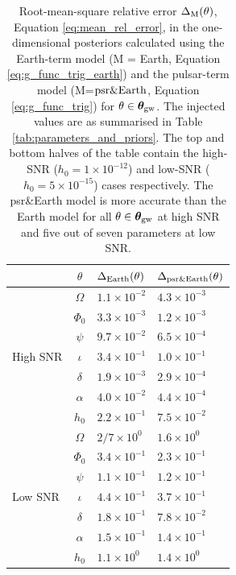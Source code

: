 \documentclass[fleqn,usenatbib,useAMS]{mnras}
\begin{document}
\begin{table}
	\centering
		\begin{tabular}{lcll}
			\toprule
			&$\theta$ & $\Delta_{\rm Earth}(\theta)$ & $\Delta_{\rm psr \& Earth}(\theta)$  \\
			\hline
			\multirow{7}{2mm}{High SNR} & $\Omega$       & $1.1 \times 10^{-2}$& $4.3 \times 10^{-3}$\\
			& $\Phi_0$ &$3.3 \times 10^{-3}$ &$1.2 \times 10^{-3}$ \\
			& $\psi$ &$9.7 \times 10^{-2}$ &$6.5 \times 10^{-4}$  \\
			& $\iota$ & $3.4 \times 10^{-1}$ & $1.0 \times 10^{-1}$  \\
			& $\delta$ &$1.9 \times10^{-3}$ &$2.9 \times 10^{-4}$  \\
			&$\alpha$ &$4.0 \times 10^{-2}$ &$4.4 \times10^{-4}$  \\
			&$h_0$ & $2.2 \times 10^{-1}$ &$7.5 \times 10^{-2}$  \\
			\hline
			\multirow{7}{2mm}{Low SNR} & $\Omega$       &  $2/7 \times 10^0$ &$1.6 \times 10^0$ \\
			& $\Phi_0$ &$3.4 \times 10^{-1}$ & $2.3 \times 10^{-1}$  \\
			& $\psi$ &$1.1 \times 10^{-1}$ &$1.2 \times 10^{-1}$  \\
			& $\iota$ & $4.4 \times 10^{-1}$ & $3.7 \times 10^{-1}$  \\
			& $\delta$ & $1.8 \times 10^{-1}$ & $7.8 \times 10^{-2}$  \\
			&$\alpha$ & $1.5 \times 10^{-1}$ & $1.4 \times 10^{-1}$ \\
			&$h_0$ & $1.1 \times 10^0$ &$1.4 \times 10^0$ \\
			\bottomrule
		\end{tabular}
		\caption{Root-mean-square relative error $\Delta_{\rm M}(\theta)$, Equation \eqref{eq:mean_rel_error}, in the one-dimensional posteriors calculated using the Earth-term model (M = Earth, Equation \eqref{eq:g_func_trig_earth}) and the pulsar-term model (M=$\rm psr \& Earth$, Equation \eqref{eq:g_func_trig}) for $\theta \in \boldsymbol{\theta}_{\rm gw}$. The injected values are as summarised in Table \ref{tab:parameters_and_priors}. The top and bottom halves of the table contain the high-SNR ($h_0 =1 \times 10^{-12}$) and low-SNR ($h_0 = 5 \times 10^{-15}$) cases respectively. The psr\&Earth model is more accurate than the Earth model for all $\theta \in \boldsymbol{\theta}_{\rm gw}$ at high SNR and five out of seven parameters at low SNR.}
		\label{tab:posterior_errors}
	\end{table}
\end{document}
